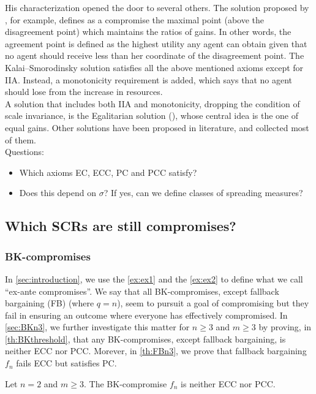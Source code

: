 \documentclass[version=3.21, pagesize, twoside=off, bibliography=totoc, DIV=calc, fontsize=12pt, a4paper]{scrartcl}
\begin{document}
His characterization opened the door to several others. The solution proposed by \cite{Kalai1975}, for example, defines as a compromise the maximal point (above the disagreement point) which maintains the ratios of gains. In other words, the agreement point is defined as the highest utility any agent can obtain given that no agent should receive less than her coordinate of the disagreement point.
The Kalai–Smorodinsky solution satisfies all the above mentioned axioms except for IIA. Instead, a monotonicity requirement is added, which says that no agent should lose from the increase in resources.
\\
A solution that includes both IIA and monotonicity, dropping the condition of scale invariance, is the Egalitarian solution (\cite{Kalai1977}), whose central idea is the one of equal gains.
\newline
Other solutions have been proposed in literature, and \cite{Thomson1994} collected most of them.
\newline\\
Questions:
\begin{itemize}
	\item Which axioms EC, ECC, PC and PCC satisfy?
	\item Does this depend on $\sigma$? If yes, can we define classes of spreading measures?
\end{itemize}

\subsection{Which SCRs are still compromises?}

\subsubsection{BK-compromises}
In \cref{sec:introduction}, we use the \cref{ex:ex1} and the \cref{ex:ex2} to define what we call “ex-ante compromises”. We say that all BK-compromises, except fallback bargaining (FB) (where $q=n$), seem to pursuit a goal of compromising but they fail in ensuring an outcome where everyone has effectively compromised. In \cref{sec:BKn3}, we further investigate this matter for $n\geq3$ and $m\geq3$ by proving, in \cref{th:BKthreshold}, that any BK-compromises, except fallback bargaining, is neither ECC nor PCC. Morever, in \cref{th:FBn3}, we prove that fallback bargaining $f_{n}$ fails ECC but satisfies PC.

\begin{Theorem}
	Let $n=2$ and $m\geq3$. The BK-compromise $f_{n}$ is neither ECC nor PCC. 
\end{Theorem}
\end{document}
